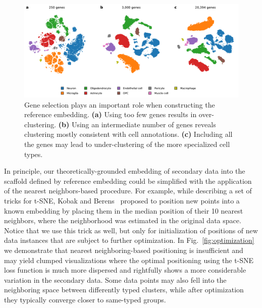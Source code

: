 \documentclass[runningheads]{llncs}
\begin{document}
\begin{figure}[htbp]
\includegraphics[width=\textwidth]{figures/hrvatin_embedding_tsne_genes.pdf}
\caption{Gene selection plays an important role when constructing the reference embedding. {\bf (a)} Using too few genes results in over-clustering. {\bf (b)} Using an intermediate number of genes reveals clustering mostly consistent with cell annotations. {\bf (c)} Including all the genes may lead to under-clustering of the more specialized cell types.}
\label{fig:gene_selection}
\end{figure}

In principle, our theoretically-grounded embedding of secondary data into the scaffold defined by reference embedding could be simplified with the application of the nearest neighbors-based procedure. For example, while describing a set of tricks for t-SNE, Kobak and Berens~\cite{art_of_using_tsne} proposed to position new points into a known embedding by placing them in the median position of their 10 nearest neighbors, where the neighborhood was estimated in the original data space. Notice that we use this trick as well, but only for initialization of positions of new data instances that are subject to further optimization. In Fig.~\ref{fig:optimization} we demonstrate that nearest neighboring-based positioning is insufficient and may yield clumped visualizations where the optimal positioning using the t-SNE loss function is much more dispersed and rightfully shows a more considerable variation in the secondary data. Some data points may also fell into the neighboring space between differently typed clusters, while after optimization they typically converge closer to same-typed groups.
\end{document}
